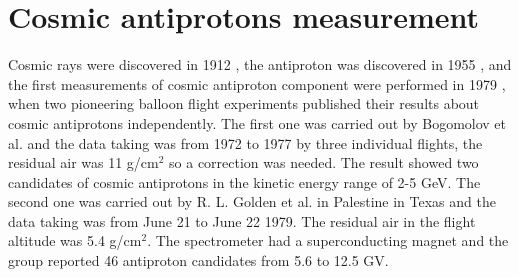 
\section{Cosmic antiprotons measurement}

Cosmic rays were discovered in 1912 \cite{NobelCosmicRay}, the antiproton was discovered in 1955 \cite{NobelAntiproton}, and the first measurements of cosmic antiproton component were performed in 1979 \cite{CosmicAntiprotonBogomolov1979, CosmicAntiprotonGolden1979}, when two pioneering balloon flight experiments published their results about cosmic antiprotons independently. The first one was carried out by Bogomolov et al. and the data taking was from 1972 to 1977 by three individual flights, the residual air was 11 g/cm$^2$ so a correction was needed. The result showed two candidates of cosmic antiprotons in the kinetic energy range of 2-5 GeV. The second one was carried out by R. L. Golden et al. in Palestine in Texas and the data taking was from June 21 to June 22 1979. The residual air in the flight altitude was 5.4 g/cm$^2$. The spectrometer had a superconducting magnet and the group reported 46 antiproton candidates from 5.6 to 12.5 GV. 

